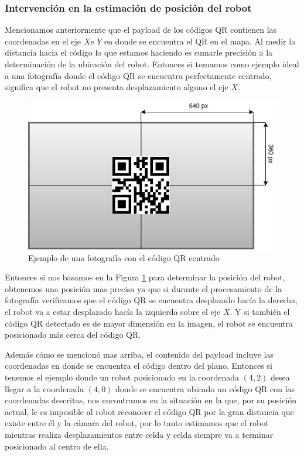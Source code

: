 \subsubsection{Intervención en la estimación de posición del robot}

Mencionamos anteriormente que el payload de los códigos QR contienen las coordenadas en el eje $X$e $Y$ en donde se encuentra el QR en el mapa. Al medir la distancia hacia el código lo que estamos haciendo es sumarle precisión a la determinación de la ubicación del robot. Entonces si tomamos como ejemplo ideal a una fotografía donde el código QR se encuentra perfectamente centrado, significa que el robot no presenta desplazamiento alguno el eje $X$.

\begin{figure}[H]
   \centering
   \includegraphics[width=0.7\linewidth]{images/ejemplo_foto_centro.jpg}
   \caption{Ejemplo de una fotografía con el código QR centrado}
   \label{fig:ejemplo_foto_centro}
\end{figure}

Entonces si nos basamos en la Figura \ref{fig:ejemplo_foto_centro} para determinar la posición del robot, obtenemos una posición mas precisa ya que si durante el procesamiento de la fotografía verificamos que el código QR se encuentra desplazado hacía la derecha, el robot va a estar desplazado hacía la izquierda sobre el eje $X$. Y si también el código QR detectado es de mayor dimensión en la imagen, el robot se encuentra posicionado más cerca del código QR.

Además cómo se mencionó mas arriba, el contenido del payload incluye las coordenadas en donde se encuentra el código dentro del plano. Entonces si tenemos el ejemplo donde un robot posicionado en la coordenada $(4,2)$ desea llegar a la coordenada $(4,0)$ donde se encuentra ubicado un código QR con las coordenadas descritas, nos encontramos en la situación en la que, por su posición actual, le es imposible al robot reconocer el código QR por la gran distancia que existe entre él y la cámara del robot, por lo tanto estimamos que el robot mientras realiza desplazamientos entre celda y celda siempre va a terminar posicionado al centro de ella.

